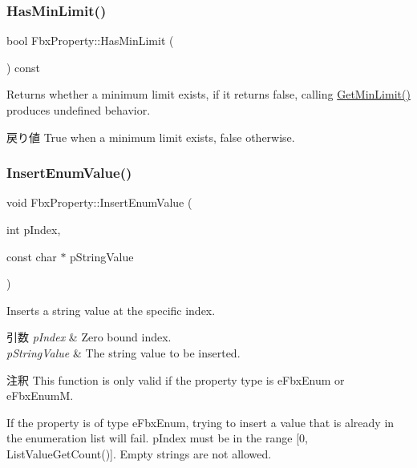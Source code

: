 \subsubsection{\texorpdfstring{Has\+Min\+Limit()}{HasMinLimit()}}
{\footnotesize\ttfamily bool Fbx\+Property\+::\+Has\+Min\+Limit (\begin{DoxyParamCaption}{ }\end{DoxyParamCaption}) const}

Returns whether a minimum limit exists, if it returns false, calling \hyperlink{class_fbx_property_abdc5ccbaea5c1e32d7b1ccfa3fd826af}{Get\+Min\+Limit()} produces undefined behavior. \begin{DoxyReturn}{戻り値}
{\ttfamily True} when a minimum limit exists, {\ttfamily false} otherwise. 
\end{DoxyReturn}
\mbox{\label{class_fbx_property_a3e03482059d70c4e86314f8922ae8d22}} 
\subsubsection{\texorpdfstring{Insert\+Enum\+Value()}{InsertEnumValue()}}
{\footnotesize\ttfamily void Fbx\+Property\+::\+Insert\+Enum\+Value (\begin{DoxyParamCaption}\item[{int}]{p\+Index,  }\item[{const char $\ast$}]{p\+String\+Value }\end{DoxyParamCaption})}

Inserts a string value at the specific index. 
\begin{DoxyParams}{引数}
{\em p\+Index} & Zero bound index. \\
\hline
{\em p\+String\+Value} & The string value to be inserted. \\
\hline
\end{DoxyParams}
\begin{DoxyRemark}{注釈}
This function is only valid if the property type is e\+Fbx\+Enum or e\+Fbx\+EnumM. 

If the property is of type e\+Fbx\+Enum, trying to insert a value that is already in the enumeration list will fail. p\+Index must be in the range \mbox{[}0, List\+Value\+Get\+Count()\mbox{]}. Empty strings are not allowed. 
\end{DoxyRemark}
\mbox{\label{class_fbx_property_a1ae3c41711a9684cb1b3e6cf454c9b12}} 
